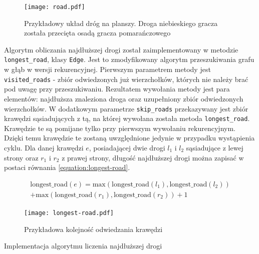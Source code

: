 \documentclass[11pt,twoside]{report}
\providecommand{\imref}[1]{Rys. \ref{#1}} %
\begin{document}
\begin{figure}[ht]
  \begin{center}
    \texttt{[image: road.pdf]}
  \end{center}
  \caption{Przykładowy układ dróg na planszy. Droga niebieskiego
    gracza została przecięta osadą gracza pomarańczowego}
  \label{road}
\end{figure}

Algorytm obliczania najdłuższej drogi został zaimplementowany w
metodzie \texttt{longest\_road}, klasy \texttt{Edge}. Jest to
zmodyfikowany algorytm przeszukiwania grafu w głąb w wersji
rekurencyjnej. Pierwszym parametrem metody jest
\texttt{visited\_roads} - zbiór odwiedzonych już wierzchołków, których
nie należy brać pod uwagę przy przeszukiwaniu. Rezultatem wywołania
metody jest para elementów: najdłuższa znaleziona droga oraz
uzupełniony zbiór odwiedzonych wierzchołków. W dodatkowym parametrze
\texttt{skip\_roads} przekazywany jest zbiór krawędzi sąsiadujących z
tą, na której wywołana została metoda
\texttt{longest\_road}. Krawędzie te są pomijane tylko przy pierwszym
wywołaniu rekurencyjnym. Dzięki temu krawędzie te zostaną uwzględnione
jedynie w przypadku wystąpienia cyklu. Dla danej krawędzi $e$,
posiadającej dwie drogi $l_1$ i $l_2$ sąsiadujące z lewej strony oraz
$r_1$ i $r_2$ z prawej strony, długość najdłuższej drogi można zapisać
w postaci równania \ref{equation:longest-road}.

\begin{equation}
  \begin{aligned}
    \text{longest\_road}(e) = \text{max}(\text{longest\_road}(l_1),
    \text{longest\_road}(l_2)) \\
    + \text{max}(\text{longest\_road}(r_1), \text{longest\_road}(r_2))
    + 1
  \end{aligned}
  \label{equation:longest-road}
\end{equation}


\begin{figure}[ht]
  \begin{center}
    \texttt{[image: longest-road.pdf]}
  \end{center}
  \caption{Przykładowa kolejność odwiedzania krawędzi}
  \label{longest-road}
\end{figure}

\begin{listing}
  
  \caption{Implementacja algorytmu liczenia najdłuższej drogi}
  \label{listing:edge}
\end{listing}
\end{document}
